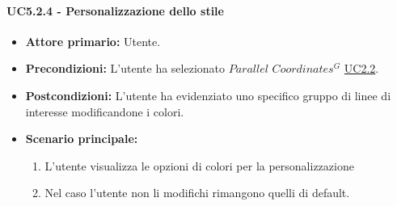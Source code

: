 \paragraph{UC5.2.4 - Personalizzazione dello stile}
\label{sec:UC5.2.4}
    \begin{itemize}
        \item \textbf{Attore primario:} Utente.
        \item \textbf{Precondizioni:} L'utente ha selezionato $Parallel$ $Coordinates^{G}$ \hyperref[sec:UC2.2]{UC2.2}.
	    \item \textbf{Postcondizioni:} L'utente ha evidenziato uno specifico gruppo di linee di interesse modificandone i colori.
	    \item \textbf{Scenario principale:} 
	    \begin{enumerate}
	    		\item L'utente visualizza le opzioni di colori per la personalizzazione
	    		\item Nel caso l'utente non li modifichi rimangono quelli di default.
		\end{enumerate}
    \end{itemize}


\newpage
